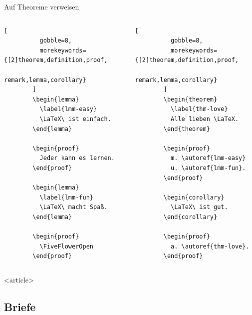 \begin{Frame}[fragile]{Auf Theoreme verweisen}
  \begin{columns}
      \begin{lstlisting}[
          gobble=8,
          morekeywords={[2]theorem,definition,proof,
            remark,lemma,corollary}
        ]
        \begin{lemma}
          \label{lmm-easy}
          \LaTeX\ ist einfach.
        \end{lemma}

        \begin{proof}
          Jeder kann es lernen.
        \end{proof}

        \begin{lemma}
          \label{lmm-fun}
          \LaTeX\ macht Spaß.
        \end{lemma}

        \begin{proof}
          \FiveFlowerOpen
        \end{proof}
      \end{lstlisting}

      \begin{lstlisting}[
          gobble=8,
          morekeywords={[2]theorem,definition,proof,
            remark,lemma,corollary}
        ]
        \begin{theorem}
          \label{thm-love}
          Alle lieben \LaTeX.
        \end{theorem}

        \begin{proof}
          m. \autoref{lmm-easy}
          u. \autoref{lmm-fun}.
        \end{proof}

        \begin{corollary}
          \LaTeX\ ist gut.
        \end{corollary}

        \begin{proof}
          a. \autoref{thm-love}.
        \end{proof}
      \end{lstlisting}
  \end{columns}
\end{Frame}

\mode
<article>


\subsection{Briefe}

